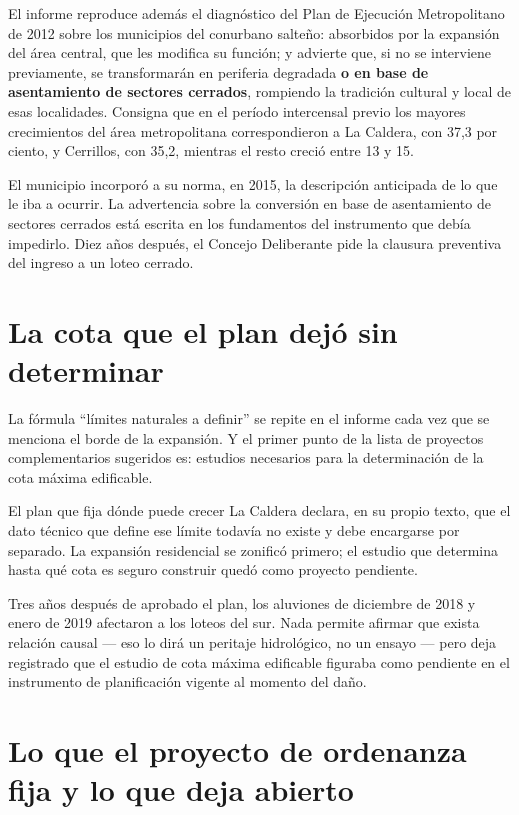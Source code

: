 El informe reproduce además el diagnóstico del Plan de Ejecución Metropolitano de 2012 sobre los municipios del conurbano salteño: absorbidos por la expansión del área central, que les modifica su función; y advierte que, si no se interviene previamente, se transformarán en periferia degradada \textbf{o en base de asentamiento de sectores cerrados}, rompiendo la tradición cultural y local de esas localidades. Consigna que en el período intercensal previo los mayores crecimientos del área metropolitana correspondieron a La Caldera, con 37,3 por ciento, y Cerrillos, con 35,2, mientras el resto creció entre 13 y 15.

\begin{cautela}
El municipio incorporó a su norma, en 2015, la descripción anticipada de lo que le iba a ocurrir. La advertencia sobre la conversión en base de asentamiento de sectores cerrados está escrita en los fundamentos del instrumento que debía impedirlo. Diez años después, el Concejo Deliberante pide la clausura preventiva del ingreso a un loteo cerrado.
\end{cautela}

\section{La cota que el plan dejó sin determinar}

La fórmula ``límites naturales a definir'' se repite en el informe cada vez que se menciona el borde de la expansión. Y el primer punto de la lista de proyectos complementarios sugeridos es: estudios necesarios para la determinación de la cota máxima edificable.

\begin{cautela}
El plan que fija dónde puede crecer La Caldera declara, en su propio texto, que el dato técnico que define ese límite todavía no existe y debe encargarse por separado. La expansión residencial se zonificó primero; el estudio que determina hasta qué cota es seguro construir quedó como proyecto pendiente.

Tres años después de aprobado el plan, los aluviones de diciembre de 2018 y enero de 2019 afectaron a los loteos del sur. Nada permite afirmar que exista relación causal --- eso lo dirá un peritaje hidrológico, no un ensayo --- pero deja registrado que el estudio de cota máxima edificable figuraba como pendiente en el instrumento de planificación vigente al momento del daño.
\end{cautela}


\section{Lo que el proyecto de ordenanza fija y lo que deja abierto}

